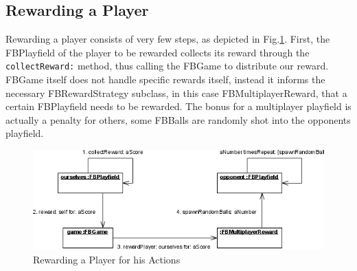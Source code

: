\subsection{Rewarding a Player}
Rewarding a player consists of very few steps, as depicted in Fig.\ref{fig:RewardingAPlayer}. 
First, the FBPlayfield of the player to be rewarded collects its reward 
through the \\{\lstinline!collectReward:!} method, thus calling the FBGame 
to distribute our reward. FBGame itself does not handle specific rewards 
itself, instead it informs the necessary FBRewardStrategy subclass, in 
this case FBMultiplayerReward, that a certain FBPlayfield needs to be 
rewarded. The bonus for a multiplayer playfield is actually a penalty 
for others, some FBBalls are randomly shot into the opponents playfield.

%
\begin{figure}[bt]
  \begin{center}
    \includegraphics[width=\linewidth]{images/RewardingAPlayer.png}
  \end{center}
  \caption{Rewarding a Player for his Actions}
  \label{fig:RewardingAPlayer}
\end{figure}
%